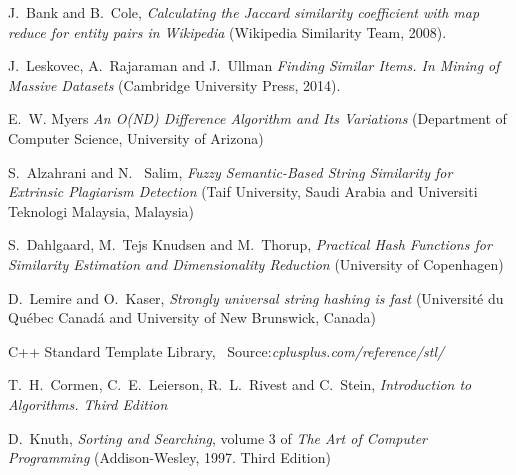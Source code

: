 \documentclass[12pt]{article}
\begin{document}

\newpage

\begin{thebibliography}{100}

J.\ Bank and B.\ Cole,
\textit {Calculating the Jaccard similarity coefficient with map reduce for entity pairs in
Wikipedia} (Wikipedia Similarity Team, 2008).

J.\ Leskovec, A.\ Rajaraman and J.\ Ullman
\textit{ Finding Similar Items. In Mining of Massive Datasets} (Cambridge University Press, 2014).

E.\ W. Myers \textit{An O(ND) Difference Algorithm and Its Variations} (Department of Computer Science, University of Arizona)

S.\ Alzahrani and N. \ Salim, \textit{Fuzzy Semantic-Based String Similarity for Extrinsic Plagiarism Detection} (Taif University, Saudi Arabia and Universiti Teknologi Malaysia, Malaysia)

S.\ Dahlgaard, M.\ Tejs Knudsen and M.\ Thorup, \textit{Practical Hash Functions for Similarity Estimation and Dimensionality Reduction} (University of Copenhagen)

D.\ Lemire and O.\ Kaser, \textit{Strongly universal string hashing is fast} (Université du Québec Canadá and University of New Brunswick, Canada) 

C++ Standard Template Library,
\ Source:\textit{cplusplus.com/reference/stl/}

T.\ H.\ Cormen, C.\ E.\ Leierson, R.\ L.\ Rivest and C.\ Stein, \textit{Introduction to Algorithms. Third Edition}

D.\ Knuth,
\textit {Sorting and Searching}, volume 3 of \textit{The Art of Computer Programming} (Addison-Wesley, 1997. Third Edition)

\end{thebibliography}
\end{document}
